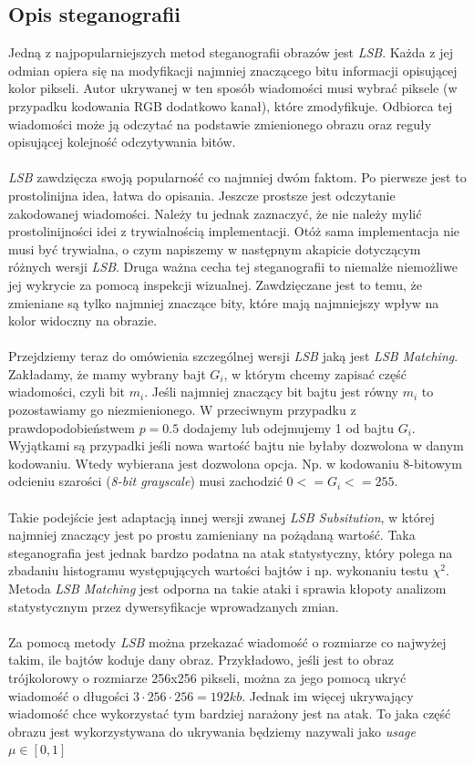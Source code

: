 \documentclass[a4paper,12pt]{article}
\begin{document}
    \subsection{Opis steganografii}
        Jedną z najpopularniejszych metod steganografii obrazów jest \textit{LSB}\cite{kombrink}. Każda z jej odmian opiera się na modyfikacji najmniej znaczącego bitu informacji opisującej kolor pikseli. Autor ukrywanej w ten sposób wiadomości musi wybrać piksele (w przypadku kodowania RGB dodatkowo kanał), które zmodyfikuje. Odbiorca tej wiadomości może ją odczytać na podstawie zmienionego obrazu oraz reguły opisującej kolejność odczytywania bitów. \\
        \\
        \textit{LSB} zawdzięcza swoją popularność co najmniej dwóm faktom. Po pierwsze jest to prostolinijna idea, łatwa do opisania. Jeszcze prostsze jest odczytanie zakodowanej wiadomości. Należy tu jednak zaznaczyć, że nie należy mylić prostolinijności idei z trywialnością implementacji. Otóż sama implementacja nie musi być trywialna, o czym napiszemy w następnym akapicie dotyczącym różnych wersji \textit{LSB}. Druga ważna cecha tej steganografii to niemalże niemożliwe jej wykrycie za pomocą inspekcji wizualnej. Zawdzięczane jest to temu, że zmieniane są tylko najmniej znaczące bity, które mają najmniejszy wpływ na kolor widoczny na obrazie.\\
        \\
        Przejdziemy teraz do omówienia szczególnej wersji \textit{LSB} jaką jest \textit{LSB Matching}. Zakładamy, że mamy wybrany bajt $G_i$, w którym chcemy zapisać część wiadomości, czyli bit $m_i$. Jeśli najmniej znaczący bit bajtu jest równy $m_i$ to pozostawiamy go niezmienionego. W przeciwnym przypadku z prawdopodobieństwem $p=0.5$ dodajemy lub odejmujemy 1 od bajtu $G_i$. Wyjątkami są przypadki jeśli nowa wartość bajtu nie byłaby dozwolona w danym kodowaniu. Wtedy wybierana jest dozwolona opcja. Np. w kodowaniu 8-bitowym odcieniu szarości (\textit{8-bit grayscale}) musi zachodzić $0 <= G_i <= 255$. \cite{sarkar} \\
        \\
        Takie podejście jest adaptacją innej wersji zwanej \textit{LSB Subsitution}, w której najmniej znaczący jest po prostu zamieniany na pożądaną wartość. Taka steganografia jest jednak bardzo podatna na atak statystyczny, który polega na zbadaniu histogramu występujących wartości bajtów i np. wykonaniu testu $\chi ^2$. Metoda \textit{LSB Matching} jest odporna na takie ataki i sprawia kłopoty analizom statystycznym przez dywersyfikacje wprowadzanych zmian.\cite{daniel, sarkar} \\
        \\
        Za pomocą metody \textit{LSB} można przekazać wiadomość o rozmiarze co najwyżej takim, ile bajtów koduje dany obraz. Przykładowo, jeśli jest to obraz trójkolorowy o rozmiarze 256x256 pikseli, można za jego pomocą ukryć wiadomość o długości $3\cdot 256 \cdot 256=192kb$. Jednak im więcej ukrywający wiadomość chce wykorzystać tym bardziej narażony jest na atak. To jaka część obrazu jest wykorzystywana do ukrywania będziemy nazywali jako \textit{usage} $\mu \in \left[ 0, 1 \right]$
    
\end{document}
